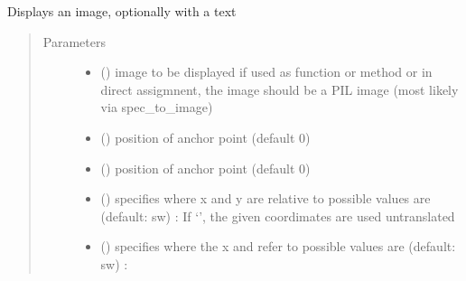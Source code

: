 \documentclass[letterpaper,10pt,english]{sphinxmanual}
\begin{document}

\begin{fulllineitems}
\label{\detokenize{Reference:salabim.AnimateImage}}
Displays an image, optionally with a text
\begin{quote}\begin{description}
\item[{Parameters}] \leavevmode\begin{itemize}
\item {} 
 () \textendash{} image to be displayed 
if used as function or method or in direct assigmnent,
the image should be a PIL image (most likely via spec\_to\_image)

\item {} 
 () \textendash{} position of anchor point (default 0)

\item {} 
 () \textendash{} position of anchor point (default 0)

\item {} 
 () \textendash{} specifies where x and y are relative to 
possible values are (default: sw) : 
If ‘’, the given coordimates are used untranslated

\item {} 
 () \textendash{} specifies where the x and refer to 
possible values are (default: sw) : 


\end{itemize}
\end{description}
\end{quote}
\end{fulllineitems}
\end{document}
